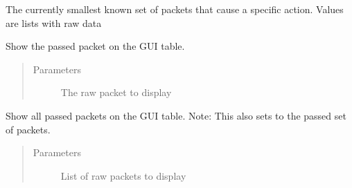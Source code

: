 \documentclass[letterpaper,10pt,english]{sphinxmanual}
\begin{document}
\begin{fulllineitems}
\begin{fulllineitems}
\end{fulllineitems}


\begin{fulllineitems}
\label{\detokenize{src:src.SearcherTab.SearcherTab.lastWorkingChunk}}
The currently smallest known set of packets that cause a specific action.
Values are lists with raw data

\end{fulllineitems}


\begin{fulllineitems}
\label{\detokenize{src:src.SearcherTab.SearcherTab.outputRemainingPacket}}
Show the passed packet on the GUI table.
\begin{quote}\begin{description}
\item[{Parameters}] \leavevmode
{} \textendash{} The raw packet to display

\end{description}\end{quote}

\end{fulllineitems}


\begin{fulllineitems}
\label{\detokenize{src:src.SearcherTab.SearcherTab.outputRemainingPackets}}
Show all passed packets on the GUI table.
Note: This also sets  to the passed set of packets.
\begin{quote}\begin{description}
\item[{Parameters}] \leavevmode
{} \textendash{} List of raw packets to display

\end{description}\end{quote}

\end{fulllineitems}


\end{fulllineitems}
\end{document}
